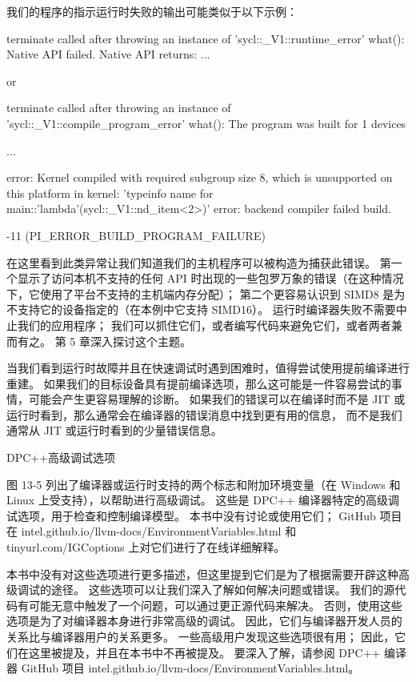 我们的程序的指示运行时失败的输出可能类似于以下示例：

terminate called after throwing an instance of 'sycl::\_V1::runtime\_error' what(): Native API failed. Native API returns: ...

or

terminate called after throwing an instance of 'sycl::\_V1::compile\_program\_error' what(): The program was built for 1 devices 

...

error: Kernel compiled with required subgroup size 8, which is unsupported on this platform in kernel: 'typeinfo name for main::'lambda'(sycl::\_V1::nd\_item<2>)' error: backend compiler failed build.

-11 (PI\_ERROR\_BUILD\_PROGRAM\_FAILURE)

在这里看到此类异常让我们知道我们的主机程序可以被构造为捕获此错误。 
第一个显示了访问本机不支持的任何 API 时出现的一些包罗万象的错误（在这种情况下，它使用了平台不支持的主机端内存分配）； 
第二个更容易认识到 SIMD8 是为不支持它的设备指定的（在本例中它支持 SIMD16）。 
运行时编译器失败不需要中止我们的应用程序； 我们可以抓住它们，或者编写代码来避免它们，或者两者兼而有之。 
第 5 章深入探讨这个主题。

当我们看到运行时故障并且在快速调试时遇到困难时，值得尝试使用提前编译进行重建。 
如果我们的目标设备具有提前编译选项，那么这可能是一件容易尝试的事情，可能会产生更容易理解的诊断。 
如果我们的错误可以在编译时而不是 JIT 或运行时看到，那么通常会在编译器的错误消息中找到更有用的信息，
而不是我们通常从 JIT 或运行时看到的少量错误信息。

{\color{red} DPC++高级调试选项}

图 13-5 列出了编译器或运行时支持的两个标志和附加环境变量（在 Windows 和 Linux 上受支持），以帮助进行高级调试。 
这些是 DPC++ 编译器特定的高级调试选项，用于检查和控制编译模型。 
本书中没有讨论或使用它们； 
GitHub 项目在 intel.github.io/llvm-docs/EnvironmentVariables.html 
和tinyurl.com/IGCoptions 上对它们进行了在线详细解释。

本书中没有对这些选项进行更多描述，但这里提到它们是为了根据需要开辟这种高级调试的途径。 
这些选项可以让我们深入了解如何解决问题或错误。 我们的源代码有可能无意中触发了一个问题，可以通过更正源代码来解决。 
否则，使用这些选项是为了对编译器本身进行非常高级的调试。 
因此，它们与编译器开发人员的关系比与编译器用户的关系更多。 
一些高级用户发现这些选项很有用； 因此，它们在这里被提及，并且在本书中不再被提及。 
要深入了解，请参阅 DPC++ 编译器 GitHub 项目 intel.github.io/llvm-docs/EnvironmentVariables.html。

